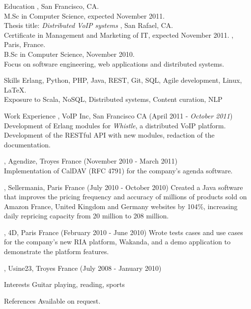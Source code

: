 \documentclass{resume}
\author{~~~~~~Edouard Swiac}
\begin{document}
\maketitle


\begin{category}{Education}
, San Francisco, CA.\\
M.Sc in Computer Science, expected November 2011.\\
Thesis title: \emph{Distributed VoIP systems}
, San Rafael, CA.\\
Certificate in Management and Marketing of IT, expected November 2011.
, Paris, France.\\
B.Sc in Computer Science, November 2010.\\
Focus on software engineering, web applications and distributed systems.
\end{category}


\begin{category}{Skills}
\citemnobullet 
Erlang, Python, PHP, Java, REST, Git, SQL, Agile development, Linux, \LaTeX.\\
Exposure to Scala, NoSQL, Distributed systems, Content curation, NLP
\end{category}

\begin{category}{Work Experience}
, VoIP Inc, San Francisco CA (April 2011 - \emph{October 2011})\\
Development of Erlang modules for \emph{Whistle}, a distributed VoIP platform.\\
Development of the RESTful API with new modules, redaction of the documentation.

, Agendize, Troyes France (November 2010 - March 2011)\\
Implementation of CalDAV (RFC 4791) for the company's agenda software.

, Sellermania, Paris France (July 2010 - October 2010)
Created a Java software that improves the pricing frequency and accuracy of millions of 
products sold on Amazon France, United Kingdom and Germany websites by 104\%, 
increasing daily repricing capacity from 20 million to 208 million.

, 4D, Paris France (February 2010 - June 2010)
Wrote tests cases and use cases for the company’s new RIA platform, Wakanda, and a demo 
application to demonstrate the platform features.

, Usine23, Troyes France (July 2008 - January 2010)

\end{category}

\begin{category}{Interests} 
\citemnobullet Guitar playing, reading, sports
\end{category}


\begin{category}{References} 
\citemnobullet Available on request.
\end{category}
\end{document}
